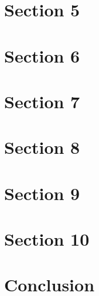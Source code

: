 \documentclass[a4paper,11pt]{article}
\begin{document}
\section{Section 5}


\section{Section 6}


\section{Section 7}


\section{Section 8}
\label{sec:trading_signals}


\section{Section 9}
\label{sec:risk_position_management}


\section{Section 10}
\label{sec:empirical-evidence-SM}

\section{Conclusion}
\label{sec:conclusion}
\end{document}
